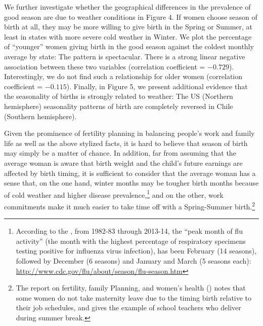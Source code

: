 \documentclass[a4paper, 12 pt]{article}
\theoremstyle{plain}
\begin{document}
\begin{doublespace}
We further investigate whether the geographical differences in the prevalence of good season are due to weather conditions in Figure 4. If women choose season of birth at all, they may be more willing to give birth in the Spring or Summer, at least in states with more severe cold weather in Winter. We plot the percentage of ``younger'' women giving birth in the good season against the coldest monthly average by state: The pattern is spectacular. There is a strong linear negative association between these two variables (correlation coefficient = $-0.729$). Interestingly, we do not find such a relationship for older women (correlation coefficient = $-0.115$). Finally, in Figure 5, we present additional evidence that the seasonality of births is strongly related to weather: The US (Northern hemisphere) seasonality patterns of birth are completely reversed in Chile (Southern hemisphere).

Given the prominence of fertility planning in balancing people's work and family life as well as the above stylized facts, it is hard to believe that season of birth may simply be a matter of chance. In addition, far from assuming that the average woman is aware that birth weight and the child's future earnings are affected by birth timing, it is sufficient to consider that the average woman has a sense that, on the one hand, winter months may be tougher birth months because of cold weather and higher disease prevalence,\footnote{According to the \citet{CDC2014}, from 1982-83 through 2013-14, the ``peak month of flu activity'' (the month with the highest percentage of respiratory specimens testing positive for influenza virus infection), has been February (14 seasons), followed by December (6 seasons) and January and March (5 seasons each): \href{http://www.cdc.gov/flu/about/season/flu-season.htm}{http://www.cdc.gov/flu/about/season/flu-season.htm}}
and on the other, work commitments make it much easier to take time off with a Spring-Summer birth.\footnote{The report on fertility, family Planning, and women's health (\citealp{CDC1997}) notes that some women do not take maternity leave due to the timing birth relative to their job schedules, and gives the example of school teachers who deliver during summer break.}


\end{doublespace}
\end{document}
